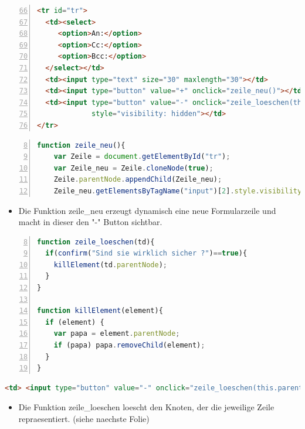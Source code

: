 \begin{frame}[<+->][fragile]
\tiny{ \begin{lstlisting}[language = HTML,
                                   mathescape = true, 
                   breaklines=true, 
                   numbers = left,
	        firstnumber=66 , 
                   numbersep = 3pt]
<tr id="tr">
  <td><select>
     <option>An:</option>
     <option>Cc:</option>
     <option>Bcc:</option>
  </select></td>
  <td><input type="text" size="30" maxlength="30"></td>
  <td><input type="button" value="+" onclick="zeile_neu()"></td>
  <td><input type="button" value="-" onclick="zeile_loeschen(this.parentNode)" 
             style="visibility: hidden"></td>
</tr>
\end{lstlisting}}
\tiny{ \begin{lstlisting}[language=JavaScript, 
		   numbers=left,
		   numbersep=3pt,
		   firstnumber= 8,
		   breaklines=true]
function zeile_neu(){
	var Zeile = document.getElementById("tr");
	var Zeile_neu = Zeile.cloneNode(true);
	Zeile.parentNode.appendChild(Zeile_neu);
	Zeile_neu.getElementsByTagName("input")[2].style.visibility="visible";}
\end{lstlisting}}
\normalsize{
\begin{itemize}
\item Die Funktion zeile\_neu erzeugt dynamisch eine neue Formularzeile und macht in dieser den "-" Button sichtbar.
\end{itemize}
}
\end{frame}
\begin{frame}[<+->][fragile]
\tiny{ \begin{lstlisting}[language=JavaScript, 
		   numbers=left,
		   numbersep=3pt,
		   firstnumber= 8,
		   breaklines=true]
function zeile_loeschen(td){
  if(confirm("Sind sie wirklich sicher ?")==true){
    killElement(td.parentNode);
  }
}

function killElement(element){
  if (element) {
    var papa = element.parentNode;
    if (papa) papa.removeChild(element);
  }
}

\end{lstlisting}}
\tiny{ \begin{lstlisting}[language = HTML,
                                   mathescape = true, 
                   breaklines=true,  
                   numbersep = 3pt]
<td> <input type="button" value="-" onclick="zeile_loeschen(this.parentNode)" style="visibility:visible"> </td>
\end{lstlisting}}
\normalsize
\begin{itemize}
\item Die Funktion zeile\_loeschen loescht den Knoten, der die jeweilige Zeile repraesentiert. (siehe naechste Folie) 
\end{itemize}
\end{frame}

